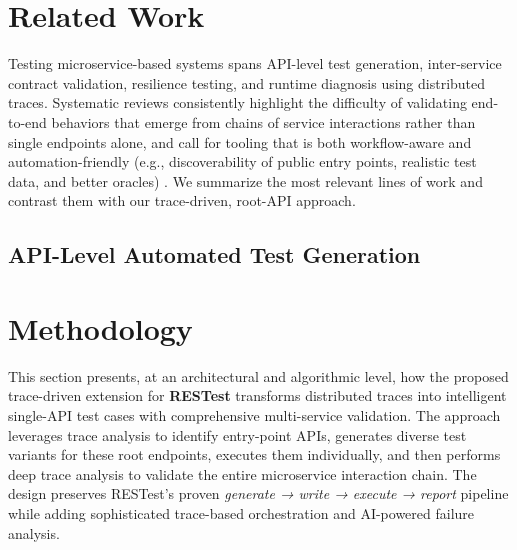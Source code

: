 \documentclass[conference]{IEEEtran}
\begin{document}



\section{Related Work}\label{sec:related}
Testing microservice-based systems spans API-level test generation, inter-service contract validation, resilience testing, and runtime diagnosis using distributed traces. Systematic reviews consistently highlight the difficulty of validating end-to-end behaviors that emerge from chains of service interactions rather than single endpoints alone, and call for tooling that is both workflow-aware and automation-friendly (e.g., discoverability of public entry points, realistic test data, and better oracles) \cite{waseem2020testing,miao2025sms}. We summarize the most relevant lines of work and contrast them with our trace-driven, root-API approach.

\subsection{API-Level Automated Test Generation}
\section{Methodology}\label{sec:method}
This section presents, at an architectural and algorithmic level, how the proposed trace-driven extension for \textbf{RESTest} transforms distributed traces into intelligent single-API test cases with comprehensive multi-service validation.  The approach leverages trace analysis to identify entry-point APIs, generates diverse test variants for these root endpoints, executes them individually, and then performs deep trace analysis to validate the entire microservice interaction chain.  The design preserves RESTest's proven \textit{generate → write → execute → report} pipeline while adding sophisticated trace-based orchestration and AI-powered failure analysis.
\end{document}
